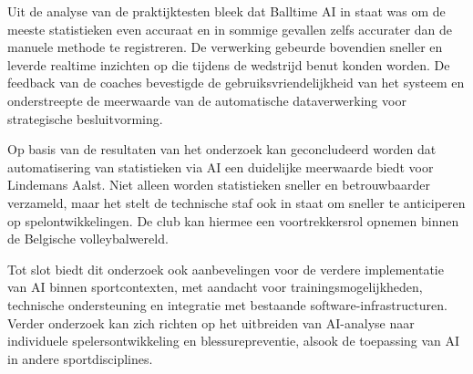 Uit de analyse van de praktijktesten bleek dat Balltime AI in staat was om de meeste statistieken even accuraat en in sommige gevallen zelfs accurater dan de manuele methode te registreren. De verwerking gebeurde bovendien sneller en leverde realtime inzichten op die tijdens de wedstrijd benut konden worden. De feedback van de coaches bevestigde de gebruiksvriendelijkheid van het systeem en onderstreepte de meerwaarde van de automatische dataverwerking voor strategische besluitvorming.

Op basis van de resultaten van het onderzoek kan geconcludeerd worden dat automatisering van statistieken via AI een duidelijke meerwaarde biedt voor Lindemans Aalst. Niet alleen worden statistieken sneller en betrouwbaarder verzameld, maar het stelt de technische staf ook in staat om sneller te anticiperen op spelontwikkelingen. De club kan hiermee een voortrekkersrol opnemen binnen de Belgische volleybalwereld.

Tot slot biedt dit onderzoek ook aanbevelingen voor de verdere implementatie van AI binnen sportcontexten, met aandacht voor trainingsmogelijkheden, technische ondersteuning en integratie met bestaande software-infrastructuren. Verder onderzoek kan zich richten op het uitbreiden van AI-analyse naar individuele spelersontwikkeling en blessurepreventie, alsook de toepassing van AI in andere sportdisciplines.
